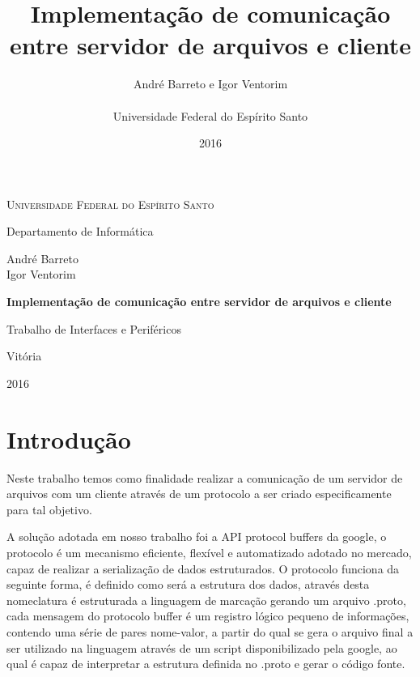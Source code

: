 \documentclass[
	11pt,				%
	oneside,			%
	a4paper,			%
	english,			%
	brazil,				%
	]{article}
\title{\textbf{Implementação de comunicação entre servidor de arquivos e cliente}}
\author{
André Barreto e Igor Ventorim\\\\
\normalsize Universidade Federal do Espírito Santo\\
}
\date{2016}
\begin{document}


\frenchspacing

\graphicspath{ {Imagens/} }

\begin{titlepage}
	\centering
	{\scshape \large Universidade Federal do Espírito Santo\par}
	{\large Departamento de Informática\par}
	\vspace{1cm}
	{\large André Barreto\\Igor Ventorim\par}
	
	\vfill
	
	{\LARGE \bfseries Implementação de comunicação entre servidor de arquivos e cliente\par}
	\vspace{1cm}
	{\large Trabalho de Interfaces e Periféricos\par}

	\vfill

	{\large Vitória\par}
	{\large 2016\par}
\end{titlepage}
\addtocounter{page}{1}

\section{Introdução}
Neste trabalho temos como finalidade realizar a comunicação de um servidor de arquivos com um cliente através de um protocolo a ser criado especificamente para tal objetivo.

A solução adotada em nosso trabalho foi a API protocol buffers da google, o protocolo é um mecanismo eficiente, flexível e automatizado adotado no mercado, capaz de realizar a serialização de dados estruturados. O protocolo funciona da seguinte forma, é definido como será a estrutura dos dados, através desta nomeclatura é estruturada a linguagem de marcação gerando um arquivo .proto, cada mensagem do protocolo buffer é um registro lógico pequeno de informações, contendo uma série de pares nome-valor, a partir do qual se gera o arquivo final a ser utilizado na linguagem através de um script disponibilizado pela google, ao qual é capaz de interpretar a estrutura definida no .proto e gerar o código fonte.
\end{document}
